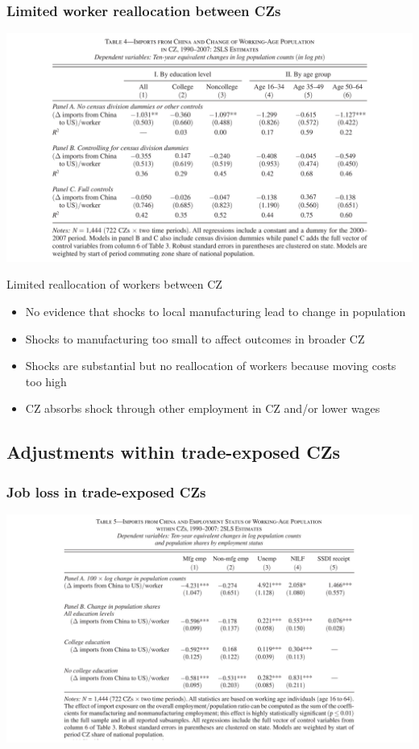 \documentclass[notes=show]{beamer}
\begin{document}
\begin{frame}
\frametitle{Limited worker reallocation between CZs}
\begin{center}
\includegraphics[width=\textwidth]{table-4.pdf}%
\end{center}
\end{frame}

\begin{frame}{Limited reallocation of workers between CZ}
\begin{itemize}
\item No evidence that shocks to local manufacturing lead to change in population \bigskip
\item Shocks to manufacturing too small to affect outcomes in broader CZ \bigskip
\item Shocks are substantial but no reallocation of workers because moving costs too high \bigskip
\item CZ absorbs shock through other employment in CZ and/or lower wages 
\end{itemize}
\end{frame}

\subsection{Adjustments within trade-exposed CZs}

\begin{frame}
\frametitle{Job loss in trade-exposed CZs}
\begin{center}
\includegraphics[width=\textwidth]{table-5.pdf}%
\end{center}
\end{frame}
\end{document}
